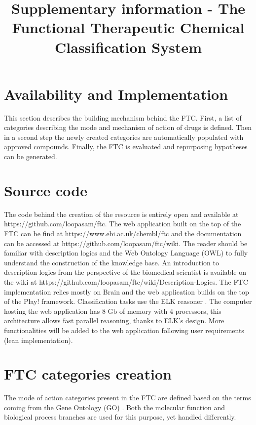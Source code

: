 \documentclass{bioinfo}
\begin{document}

\title[Supplementary information - The Functional Therapeutic Chemical Classification System]{Supplementary information - 
The Functional Therapeutic Chemical Classification System}

\section*{Availability and Implementation}

This section describes the building mechanism behind the FTC. 
First, a list of categories describing the mode and mechanism of action of drugs is defined. 
Then in a second step the newly created categories are automatically populated with approved compounds. 
Finally, the FTC is evaluated and repurposing hypotheses can be generated.

\section{Source code}
The code behind the creation of the resource is entirely open and available 
at {{https://github.com/loopasam/ftc}}. The web application built on the top of the 
FTC can be find at {{https://www.ebi.ac.uk/chembl/ftc}} and the documentation can be 
accessed at {{https://github.com/loopasam/ftc/wiki}}. The reader should be familiar with 
description logics and the Web Ontology Language (OWL) to fully understand the construction of the 
knowledge base. An introduction to description logics from the perspective of the biomedical scientist is 
available on the wiki at {{https://github.com/loopasam/ftc/wiki/Description-Logics}}. The FTC implementation 
relies mostly on Brain \citep{Croset2013} and the web application builds on the top of the Play! framework. 
Classification tasks use the ELK reasoner \citep{Kazakov2011}. The computer hosting the web application has 8 Gb of memory 
with 4 processors, this architecture allows fast parallel reasoning, thanks to ELK’s design. More functionalities 
will be added to the web application following user requirements (lean implementation).

\section{FTC categories creation}
The mode of action categories present in the FTC are defined based on the terms coming from the 
Gene Ontology (GO) \citep{Ashburner2000}. Both the molecular function and biological process branches are used for 
this purpose, yet handled differently.
\end{document}
